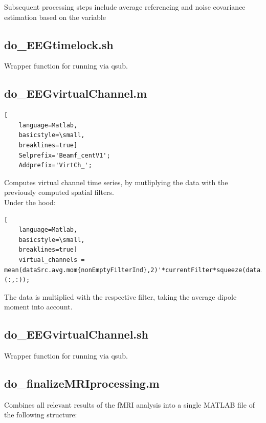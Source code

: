 \documentclass[12pt,a4paper]{scrartcl}
\begin{document}
\noindent Subsequent processing steps include average referencing and noise covariance estimation based on the variable \\

\subsection{do\_EEGtimelock.sh}
\label{sh:timelock}
Wrapper function for running \texttt{} via qsub.\\

\subsection{do\_EEGvirtualChannel.m}
\label{m:virtch}
\begin{lstlisting}[
    language=Matlab,
    basicstyle=\small,
    breaklines=true]
    Selprefix='Beamf_centV1';
    Addprefix='VirtCh_';
\end{lstlisting}
Computes virtual channel time series, by mutliplying the data with the previously computed spatial filters.\\

\noindent Under the hood:
\begin{lstlisting}[
    language=Matlab,
    basicstyle=\small,
    breaklines=true]
    virtual_channels = mean(dataSrc.avg.mom{nonEmptyFilterInd},2)'*currentFilter*squeeze(data.trial{trial}(:,:));
\end{lstlisting}

The data is multiplied with the respective filter, taking the average dipole moment into account.\\

\subsection{do\_EEGvirtualChannel.sh}
\label{sh:virtch}
Wrapper function for running \texttt{} via qsub.\\

\subsection{do\_finalizeMRIprocessing.m}
\label{m:fMRI}
Combines all relevant results of the fMRI analysis into a single MATLAB file of the following structure:\\
\end{document}
